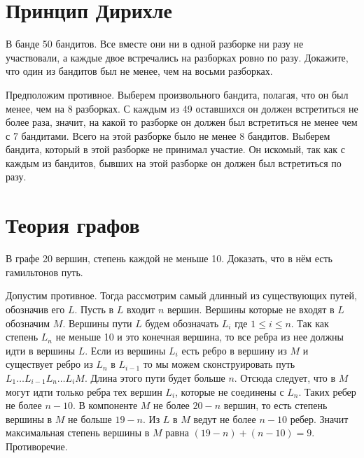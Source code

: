 \documentclass[11pt, a4paper]{template}
\begin{document}
\chapter{Принцип Дирихле}

\begin{exercise}
В банде 50 бандитов. Все вместе они ни в одной разборке ни разу не участвовали, а каждые двое встречались на разборках ровно по разу. Докажите, что один из бандитов был не менее, чем на восьми разборках.
\end{exercise}

\begin{solution}
Предположим противное. Выберем произвольного бандита, полагая, что он был менее, чем на 8 разборках. С каждым из 49 оставшихся он должен встретиться не более раза, значит, на какой то разборке он должен был встретиться не менее чем с 7 бандитами. Всего на этой разборке было не менее 8 бандитов. Выберем бандита, который в этой разборке не принимал участие. Он искомый, так как с каждым из бандитов, бывших на этой разборке он должен был встретиться по разу. 
\end{solution}

\chapter{Теория графов}

\begin{exercise}
В графе 20 вершин, степень каждой не меньше 10. Доказать, что в нём есть гамильтонов путь.
\end{exercise}

\begin{solution}
Допустим противное. Тогда рассмотрим самый длинный из существующих путей, обозначив его $L$. Пусть в $L$ входит $n$ вершин. Вершины которые не входят в $L$ обозначим $M$. Вершины пути $L$ будем обозначать $L_{i}$ где $1 \leqslant i \leqslant n$. Так как степень $L_{n}$ не меньше 10 и это конечная вершина, то все ребра из нее должны идти в вершины $L$. Если из вершины $L_{i}$ есть ребро в вершину из $M$ и существует ребро из $L_{n}$ в $L_{i - 1}$ то мы можем сконструировать путь $L_{1} \dots L_{i-1}L_{n}\dots L_{i} M$. Длина этого пути будет больше $n$. Отсюда следует, что в $M$ могут идти только ребра тех вершин $L_{i}$, которые не соединены с $L_{n}$. Таких ребер не более $n - 10$. В компоненте $M$ не более $20 - n$ вершин, то есть степень вершины в $M$ не больше $19 - n$. Из $L$ в $M$ ведут не более $n - 10$ ребер. Значит максимальная степень вершины в $M$ равна $(19 - n) + (n - 10) = 9$. Противоречие.
\end{solution}
\end{document}
